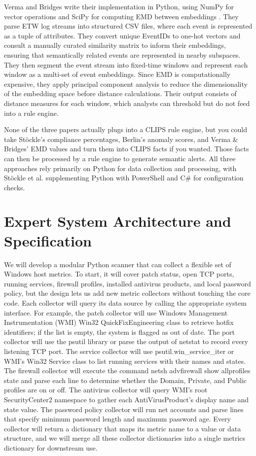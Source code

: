 \documentclass[conference, letterpaper]{IEEEtran}
\begin{document}
    Verma and Bridges write their implementation in Python, using NumPy for vector operations and SciPy for computing EMD between embeddings \cite{b3}. They parse ETW log streams into structured CSV files, where each event is represented as a tuple of attributes. They convert unique EventIDs to one-hot vectors and consult a manually curated similarity matrix to inform their embeddings, ensuring that semantically related events are represented in nearby subspaces. They then segment the event stream into fixed-time windows and represent each window as a multi-set of event embeddings. Since EMD is computationally expensive, they apply principal component analysis to reduce the dimensionality of the embedding space before distance calculations. Their output consists of distance measures for each window, which analysts can threshold but do not feed into a rule engine.

    None of the three papers actually plugs into a CLIPS rule engine, but you could take Stöckle's compliance percentages, Berlin's anomaly scores, and Verma \& Bridges' EMD values and turn them into CLIPS facts if you wanted. Those facts can then be processed by a rule engine to generate semantic alerts. All three approaches rely primarily on Python for data collection and processing, with Stöckle et al. supplementing Python with PowerShell and C\# for configuration checks.

    \section{Expert System Architecture and Specification}
    We will develop a modular Python scanner that can collect a flexible set of Windows host metrics. To start, it will cover patch status, open TCP ports, running services, firewall profiles, installed antivirus products, and local password policy, but the design lets us add new metric collectors without touching the core code. Each collector will query its data source by calling the appropriate system interface. For example, the patch collector will use Windows Management Instrumentation (WMI) Win32 QuickFixEngineering class to retrieve hotfix identifiers; if the list is empty, the system is flagged as out of date. The port collector will use the psutil library or parse the output of netstat to record every listening TCP port. The service collector will use psutil.win\_service\_iter or WMI's Win32 Service class to list running services with their names and states. The firewall collector will execute the command netsh advfirewall show allprofiles state and parse each line to determine whether the Domain, Private, and Public profiles are on or off. The antivirus collector will query WMI's root SecurityCenter2 namespace to gather each AntiVirusProduct’s display name and state value. The password policy collector will run net accounts and parse lines that specify minimum password length and maximum password age. Every collector will return a dictionary that maps its metric name to a value or data structure, and we will merge all these collector dictionaries into a single metrics dictionary for downstream use.
    
\end{document}
